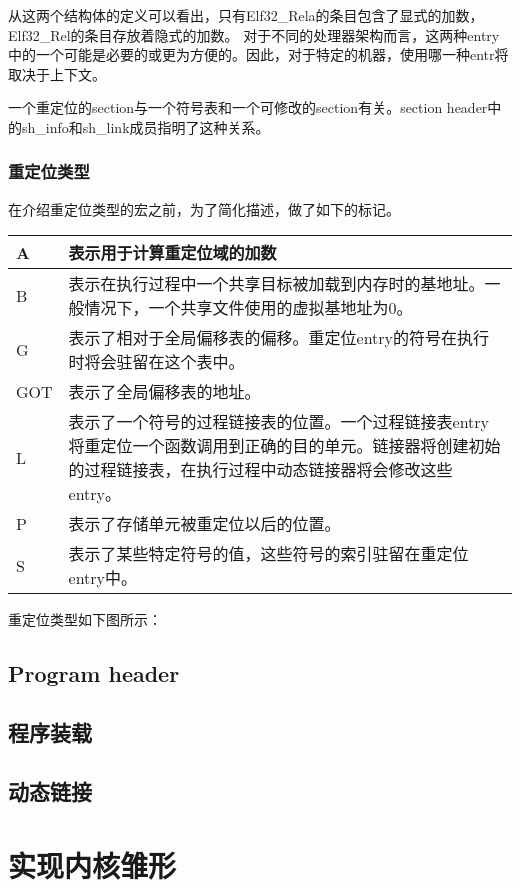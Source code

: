 \documentclass[a4paper,left=2.5cm,right=2.5cm,11pt]{article}
\newcommand{\interval}{\vspace{0.5em}}
\begin{document}
	从这两个结构体的定义可以看出，只有Elf32\_Rela的条目包含了显式的加数，Elf32\_Rel的条目存放着隐式的加数。
	对于不同的处理器架构而言，这两种entry中的一个可能是必要的或更为方便的。因此，对于特定的机器，使用哪一种entr将取决于上下文。\par

	一个重定位的section与一个符号表和一个可修改的section有关。section header中的sh\_info和sh\_link成员指明了这种关系。

\subsubsection{重定位类型}
	在介绍重定位类型的宏之前，为了简化描述，做了如下的标记。

	\interval
	\begin{longtable}{p{2cm}p{9cm}}
	\hline
	A & 表示用于计算重定位域的加数 \\
	\hline
	B & 表示在执行过程中一个共享目标被加载到内存时的基地址。一般情况下，一个共享文件使用的虚拟基地址为0。\\
	\hline
	G & 表示了相对于全局偏移表的偏移。重定位entry的符号在执行时将会驻留在这个表中。\\
	\hline
	GOT & 表示了全局偏移表的地址。\\
	\hline
	L & 表示了一个符号的过程链接表的位置。一个过程链接表entry将重定位一个函数调用到正确的目的单元。链接器将创建初始的过程链接表，在执行过程中动态链接器将会修改这些entry。\\
	\hline
	P & 表示了存储单元被重定位以后的位置。\\
	\hline
	S & 表示了某些特定符号的值，这些符号的索引驻留在重定位entry中。\\
	\hline
	\end{longtable}
	\interval

	重定位类型如下图所示：
	


\subsection{Program header}
\subsection{程序装载}
\subsection{动态链接}

\clearpage

\section{实现内核雏形}
\end{document}
